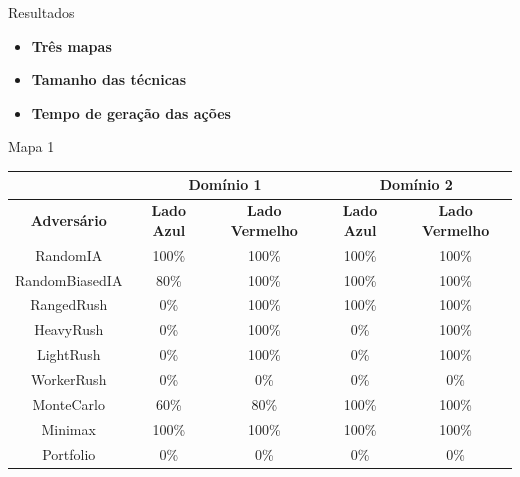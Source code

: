 \documentclass{beamer}
\begin{document}
{
	\begin{frame}{Resultados}
		\vspace{5mm}
		\begin{itemize}
			\item \textbf{Três mapas}
			\item \textbf{Tamanho das técnicas}
			\item \textbf{Tempo de geração das ações}
		\end{itemize}
	\end{frame}
}
\begin{frame}{Mapa 1}
	
	{\footnotesize
	\begin{tabular}{|c|cc|cc|}
		\hline
		\textbf{}           & \multicolumn{2}{c|}{\textbf{Domínio 1}}  & \multicolumn{2}{c|}{\textbf{Domínio 2}}  \\ \hline
		\textbf{Adversário} & \textbf{Lado Azul} & \textbf{Lado Vermelho} & \textbf{Lado Azul} & \textbf{Lado Vermelho} \\ \hline
		RandomIA            & 100\%              & 100\%                  & 100\%              & 100\%                  \\ \hline
		RandomBiasedIA      & 80\%               & 100\%                  & 100\%              & 100\%                  \\ \hline
		RangedRush          & 0\%                & 100\%                  & 100\%              & 100\%                  \\ \hline
		HeavyRush           & 0\%                & 100\%                  & 0\%                & 100\%                  \\ \hline
		LightRush           & 0\%                & 100\%                  & 0\%                & 100\%                  \\ \hline
		WorkerRush          & 0\%                & 0\%                    & 0\%                & 0\%                    \\ \hline
		MonteCarlo          & 60\%               & 80\%                   & 100\%              & 100\%                  \\ \hline
		Minimax             & 100\%              & 100\%                  & 100\%              & 100\%                  \\ \hline
		Portfolio           & 0\%                & 0\%                    & 0\%                & 0\%                    \\ \hline
	\end{tabular}
	}
\end{frame}
\end{document}
